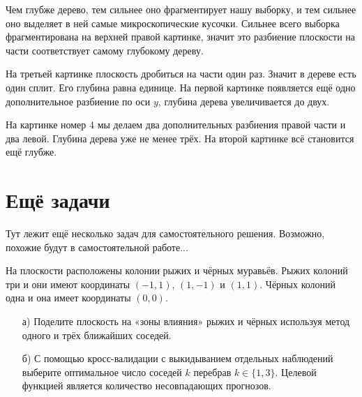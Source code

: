 \documentclass[12pt, a4paper, oneside]{article}
\theoremstyle{plain} %
\theoremstyle{definition}
\begin{document}
\begin{solution}
Чем глубже дерево, тем сильнее оно фрагментирует нашу выборку, и тем сильнее оно выделяет в ней самые микроскопические кусочки.  Сильнее всего выборка фрагментирована на верхней правой картинке, значит это разбиение плоскости на части соответствует самому глубокому дереву. 

На третьей картинке плоскость дробиться на части один раз. Значит в дереве есть один сплит. Его глубина равна единице. На первой картинке появляется ещё одно дополнительное разбиение по оси $y$, глубина дерева увеличивается до двух. 

На картинке номер $4$ мы делаем два дополнительных разбиения правой части и два левой. Глубина дерева уже не менее трёх. На второй картинке всё становится ещё глубже. 
\end{solution}

\section*{Ещё задачи} 

Тут лежит ещё несколько задач для самостоятельного решения. Возможно, похожие будут в самостоятельной работе... 

\begin{problem}{}
На плоскости расположены колонии рыжих и чёрных муравьёв. Рыжих колоний три и они имеют координаты $(-1, 1)$, $(1, -1)$ и $(1, 1)$. Чёрных колоний одна и она имеет координаты $(0, 0)$.

\begin{enumerate}
\item[а)] Поделите плоскость на «зоны влияния» рыжих и чёрных используя метод одного и трёх ближайших соседей.

\item[б)] С помощью кросс-валидации с выкидыванием отдельных наблюдений выберите оптимальное число соседей $k$ перебрав $k \in \{1, 3 \}$. Целевой функцией является количество несовпадающих прогнозов.
\end{enumerate}
\end{problem}
\end{document}
